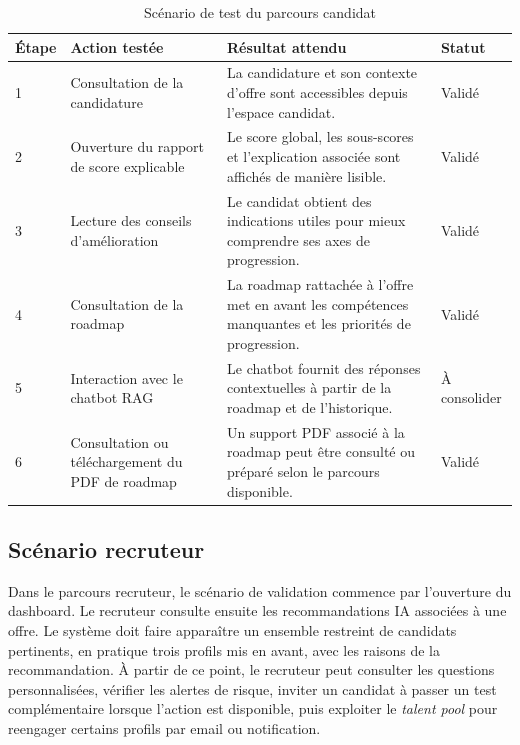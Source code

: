 \begin{table}[H]
\centering
\small
\renewcommand{\arraystretch}{1.3}
\begin{tabular}{|p{2.3cm}|p{4.2cm}|p{5.2cm}|p{2.3cm}|}
\hline
\rowcolor{headerblue}
\textbf{Étape} & \textbf{Action testée} & \textbf{Résultat attendu} & \textbf{Statut} \\
\hline
1 & Consultation de la candidature & La candidature et son contexte d'offre sont accessibles depuis l'espace candidat. & Validé \\
\hline
2 & Ouverture du rapport de score explicable & Le score global, les sous-scores et l'explication associée sont affichés de manière lisible. & Validé \\
\hline
3 & Lecture des conseils d'amélioration & Le candidat obtient des indications utiles pour mieux comprendre ses axes de progression. & Validé \\
\hline
4 & Consultation de la roadmap & La roadmap rattachée à l'offre met en avant les compétences manquantes et les priorités de progression. & Validé \\
\hline
5 & Interaction avec le chatbot RAG & Le chatbot fournit des réponses contextuelles à partir de la roadmap et de l'historique. & À consolider \\
\hline
6 & Consultation ou téléchargement du PDF de roadmap & Un support PDF associé à la roadmap peut être consulté ou préparé selon le parcours disponible. & Validé \\
\hline
\end{tabular}
\normalsize
\caption{Scénario de test du parcours candidat}
\end{table}

\subsection{Scénario recruteur}

Dans le parcours recruteur, le scénario de validation commence par l'ouverture du dashboard. Le recruteur consulte ensuite les recommandations IA associées à une offre. Le système doit faire apparaître un ensemble restreint de candidats pertinents, en pratique trois profils mis en avant, avec les raisons de la recommandation. À partir de ce point, le recruteur peut consulter les questions personnalisées, vérifier les alertes de risque, inviter un candidat à passer un test complémentaire lorsque l'action est disponible, puis exploiter le \textit{talent pool} pour reengager certains profils par email ou notification.

